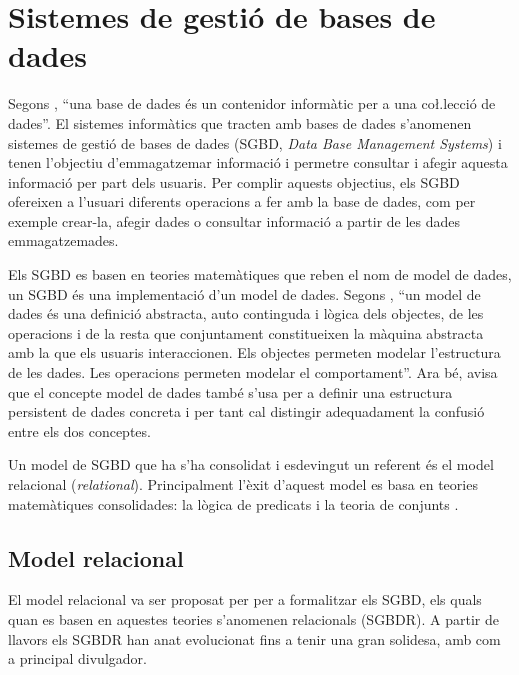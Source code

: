 \section{Sistemes de gestió de bases de dades}
\label{sec:art:sgbd}


Segons \textcite{date:introduction}, ``una base de dades és un
contenidor informàtic per a una co\l.lecció de dades''. El sistemes
informàtics que tracten amb bases de dades s'anomenen sistemes de
gestió de bases de dades (SGBD, \emph{Data Base Management Systems}) i
tenen l'objectiu d'emmagatzemar informació i permetre consultar i
afegir aquesta informació per part dels usuaris.  Per complir aquests
objectius, els SGBD ofereixen a l'usuari diferents operacions a fer
amb la base de dades, com per exemple crear-la, afegir dades o
consultar informació a partir de les dades emmagatzemades.

Els SGBD es basen en teories matemàtiques que reben el nom de model de
dades, un SGBD és una implementació d'un model de dades.  Segons
\citeauthor{date:introduction}, ``un model de dades és una definició
abstracta, auto continguda i lògica dels objectes, de les operacions i
de la resta que conjuntament constitueixen la màquina abstracta amb la
que els usuaris interaccionen. Els objectes permeten modelar
l'estructura de les dades. Les operacions permeten modelar el
comportament''. Ara bé, \citeauthor{date:introduction} avisa que el
concepte model de dades també s'usa per a definir una estructura
persistent de dades concreta i per tant cal distingir adequadament la
confusió entre els dos conceptes.

Un model de SGBD que ha s'ha consolidat i esdevingut un referent és el
model relacional (\emph{relational}). Principalment l'èxit d'aquest
model es basa en teories matemàtiques consolidades: la lògica de
predicats i la teoria de conjunts \parencite{date:introduction}.



\subsection{Model relacional}

El model relacional va ser proposat per \textcite{codd70} per a
formalitzar els SGBD, els quals quan es basen en aquestes teories
s'anomenen relacionals (SGBDR). A partir de llavors els SGBDR han anat
evolucionat fins a tenir una gran solidesa, amb
\textcite{date:introduction,date06,date:dictionary} com a principal
divulgador.



